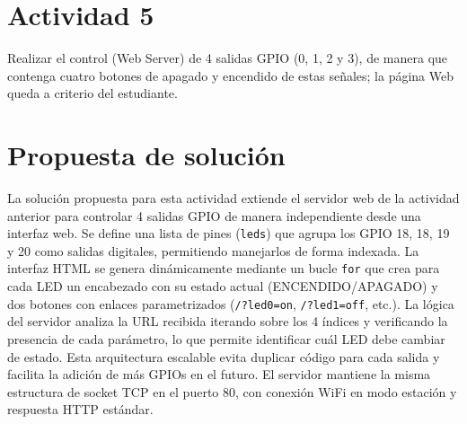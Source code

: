 \documentclass[letterpaper,12pt]{article}
\begin{document}
    \newpage
    \section*{Actividad 5}
    \noindent Realizar el control (Web Server) de 4 salidas GPIO (0, 1, 2 y 3), de manera que contenga
    cuatro botones de apagado y encendido de estas señales; la página Web queda a criterio del
    estudiante.


    \section*{Propuesta de solución}

    La solución propuesta para esta actividad extiende el servidor web de la actividad anterior para controlar 4 salidas GPIO de manera independiente desde una interfaz web. Se define una lista de pines (\texttt{leds}) que agrupa los GPIO 18, 18, 19 y 20 como salidas digitales, permitiendo manejarlos de forma indexada. La interfaz HTML se genera dinámicamente mediante un bucle \texttt{for} que crea para cada LED un encabezado con su estado actual (ENCENDIDO/APAGADO) y dos botones con enlaces parametrizados (\texttt{/?led0=on}, \texttt{/?led1=off}, etc.). La lógica del servidor analiza la URL recibida iterando sobre los 4 índices y verificando la presencia de cada parámetro, lo que permite identificar cuál LED debe cambiar de estado. Esta arquitectura escalable evita duplicar código para cada salida y facilita la adición de más GPIOs en el futuro. El servidor mantiene la misma estructura de socket TCP en el puerto 80, con conexión WiFi en modo estación y respuesta HTTP estándar.
\end{document}

